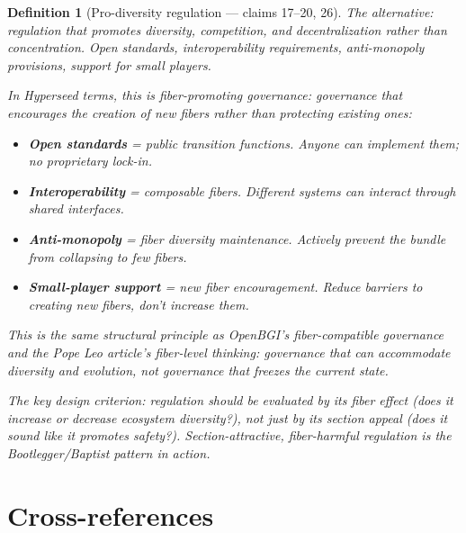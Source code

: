 \documentclass[11pt,a4paper]{article}
\newtheorem{definition}{Definition}[section]
\begin{document}
\begin{definition}[Pro-diversity regulation --- claims 17--20, 26]
\label{def:alternative}
The alternative: regulation that promotes diversity, competition, and
decentralization rather than concentration. Open standards,
interoperability requirements, anti-monopoly provisions, support for
small players.

In Hyperseed terms, this is \emph{fiber-promoting governance}:
governance that encourages the creation of new fibers rather than
protecting existing ones:
\begin{itemize}
\item \textbf{Open standards} = public transition functions. Anyone
  can implement them; no proprietary lock-in.
\item \textbf{Interoperability} = composable fibers. Different
  systems can interact through shared interfaces.
\item \textbf{Anti-monopoly} = fiber diversity maintenance. Actively
  prevent the bundle from collapsing to few fibers.
\item \textbf{Small-player support} = new fiber encouragement. Reduce
  barriers to creating new fibers, don't increase them.
\end{itemize}

This is the same structural principle as OpenBGI's fiber-compatible
governance and the Pope Leo article's fiber-level thinking: governance
that can accommodate diversity and evolution, not governance that
freezes the current state.

The key design criterion: regulation should be evaluated by its
\emph{fiber effect} (does it increase or decrease ecosystem
diversity?), not just by its \emph{section appeal} (does it sound
like it promotes safety?). Section-attractive, fiber-harmful
regulation is the Bootlegger/Baptist pattern in action.
\end{definition}


\section{Cross-references}
\end{document}
